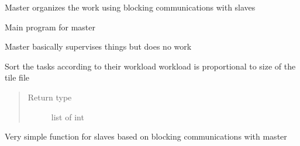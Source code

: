 \documentclass[letterpaper,10pt,english]{sphinxmanual}
\begin{document}

\begin{fulllineitems}
\label{\detokenize{pargopy:pargopy.task_giver.master_work_blocking}}
Master organizes the work using blocking communications with
slaves

\end{fulllineitems}


\begin{fulllineitems}
\label{\detokenize{pargopy:pargopy.task_giver.master_work_nonblocking}}
Main program for master

Master basically supervises things but does no work

\end{fulllineitems}


\begin{fulllineitems}
\label{\detokenize{pargopy:pargopy.task_giver.ordering_tasks}}
Sort the tasks according to their workload
workload is proportional to size of the tile file
\begin{quote}\begin{description}
\item[{Return type}] \leavevmode
list of int

\end{description}\end{quote}

\end{fulllineitems}


\begin{fulllineitems}
\label{\detokenize{pargopy:pargopy.task_giver.slave_work_blocking}}
Very simple function for slaves based on blocking communications
with master

\end{fulllineitems}
\end{document}

